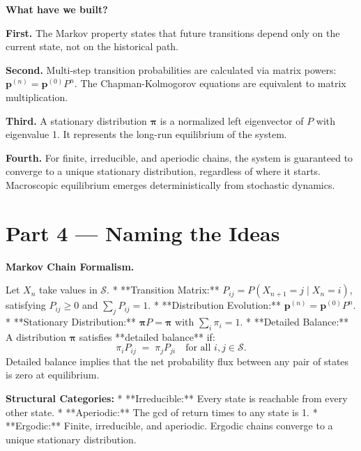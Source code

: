 \documentclass[12pt, a4paper]{article}
\begin{document}
\begin{discoverybox}
\textbf{What have we built?}

\textbf{First.} The Markov property states that future transitions depend only on the current state, not on the historical path.

\textbf{Second.} Multi-step transition probabilities are calculated via matrix powers: $\mathbf{p}^{(n)} = \mathbf{p}^{(0)} P^n$. The Chapman-Kolmogorov equations are equivalent to matrix multiplication.

\textbf{Third.} A stationary distribution $\boldsymbol{\pi}$ is a normalized left eigenvector of $P$ with eigenvalue 1. It represents the long-run equilibrium of the system.

\textbf{Fourth.} For finite, irreducible, and aperiodic chains, the system is guaranteed to converge to a unique stationary distribution, regardless of where it starts. Macroscopic equilibrium emerges deterministically from stochastic dynamics.
\end{discoverybox}

\newpage

\section{Part 4 \texorpdfstring{---}{--} Naming the Ideas}

\begin{namebox}
\textbf{Markov Chain Formalism.}

Let $X_n$ take values in $\mathcal{S}$.
* **Transition Matrix:** $P_{ij} = P(X_{n+1} = j \mid X_n = i)$, satisfying $P_{ij} \ge 0$ and $\sum_j P_{ij} = 1$.
* **Distribution Evolution:** $\mathbf{p}^{(n)} = \mathbf{p}^{(0)} P^n$.
* **Stationary Distribution:** $\boldsymbol{\pi} P = \boldsymbol{\pi}$ with $\sum_i \pi_i = 1$.
* **Detailed Balance:** A distribution $\boldsymbol{\pi}$ satisfies **detailed balance** if:
  \[
    \pi_i P_{ij} \;=\; \pi_j P_{ji} \quad \text{for all } i, j \in \mathcal{S}.
  \]
  Detailed balance implies that the net probability flux between any pair of states is zero at equilibrium.

\medskip
\textbf{Structural Categories:}
* **Irreducible:** Every state is reachable from every other state.
* **Aperiodic:** The gcd of return times to any state is 1.
* **Ergodic:** Finite, irreducible, and aperiodic. Ergodic chains converge to a unique stationary distribution.
\end{namebox}
\end{document}
